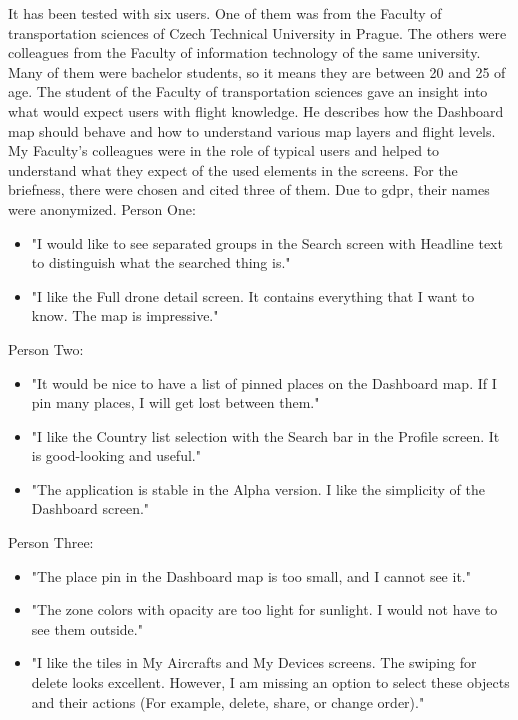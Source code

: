 It has been tested with six users.
One of them was from the Faculty of transportation sciences of Czech Technical University in Prague.
The others were colleagues from the Faculty of information technology of the same university.
Many of them were bachelor students, so it means they are between 20 and 25 of age.
The student of the Faculty of transportation sciences gave an insight into what would expect users with flight knowledge.
He describes how the Dashboard map should behave and how to understand various map layers and flight levels.
My Faculty’s colleagues were in the role of typical users and helped to understand what they expect of the used elements in the screens.
For the briefness, there were chosen and cited three of them.
Due to \acrshort{gdpr}, their names were anonymized.
\newline
\newline
Person One:
\begin{itemize}
    \item "I would like to see separated groups in the Search screen with Headline text to distinguish what the searched thing is."
    \item "I like the Full drone detail screen.
    It contains everything that I want to know.
    The map is impressive."
\end{itemize}
Person Two:
\begin{itemize}
    \item "It would be nice to have a list of pinned places on the Dashboard map.
    If I pin many places, I will get lost between them."
    \item "I like the Country list selection with the Search bar in the Profile screen.
    It is good-looking and useful."
    \item "The application is stable in the Alpha version.
    I like the simplicity of the Dashboard screen."
\end{itemize}
Person Three:
\begin{itemize}
    \item "The place pin in the Dashboard map is too small, and I cannot see it."
    \item "The zone colors with opacity are too light for sunlight.
    I would not have to see them outside."
    \item "I like the tiles in My Aircrafts and My Devices screens.
    The swiping for delete looks excellent.
    However, I am missing an option to select these objects and their actions (For example, delete, share, or change order)."
\end{itemize}


